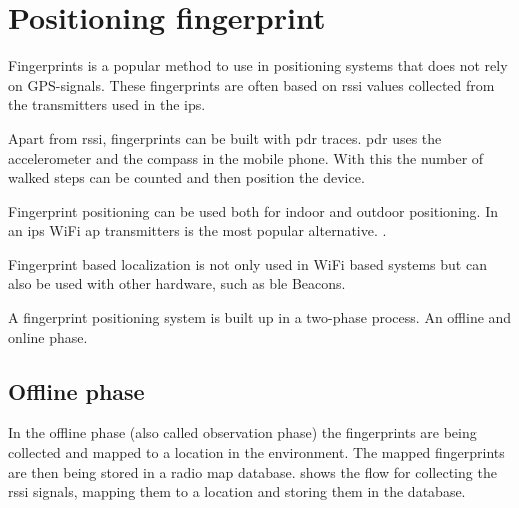 \section{Positioning fingerprint}\label{sec:theoryFingerprint}
Fingerprints is a popular method to use in positioning systems that does not rely on GPS-signals.
These fingerprints are often based on \acrshort{rssi} values collected from the transmitters used in the \acrfull{ips}.
\cite{LocationFingerprintingInfrastructure2004, AutomaticConstructionRadio2018}

\bigskip


\bigskip

Apart from \acrshort{rssi}, fingerprints can be built with \acrfull{pdr} traces.
\acrshort{pdr} uses the accelerometer and the compass in the mobile phone.
With this the number of walked steps can be counted and then position the device.
\cite{AutomaticConstructionRadio2018, NoNeedWardrive2012}

\bigskip

Fingerprint positioning can be used both for indoor and outdoor positioning.
In an \acrshort{ips} WiFi \acrshort{ap} transmitters is the most popular alternative.
\cite{LocationFingerprintingInfrastructure2004,
IndoorFingerprintPositioning2017}.

\bigskip

Fingerprint based localization is not only used in WiFi based systems but can
also be used with other hardware, such as \acrlong{ble} Beacons.
\cite{PracticalFingerprintingLocalization2017} 

\bigskip

A fingerprint positioning system is built up in a two-phase process.
An offline and online phase.\cite{IndoorFingerprintPositioning2017} 


\subsection{Offline phase}\label{sec:theoryFingerprintOffline}
In the offline phase (also called observation phase) the fingerprints are being collected and
mapped to a location in the environment.
The mapped fingerprints are then being stored in a radio map database.
 shows the flow for collecting the \acrshort{rssi} signals, mapping them to a location and storing them in the database.
\cite{IndoorFingerprintPositioning2017} 

